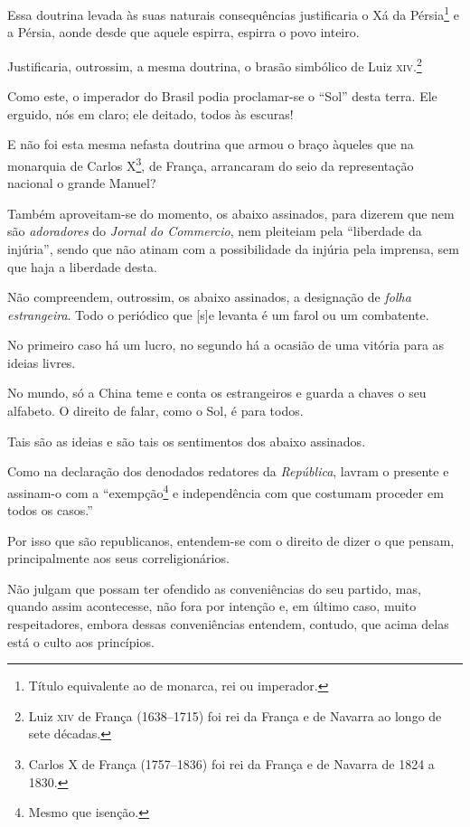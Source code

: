 Essa doutrina levada às suas naturais consequências justificaria o Xá da
Pérsia\footnote{ Título equivalente ao de monarca, rei ou imperador.} e
a Pérsia, aonde desde que aquele espirra, espirra o povo inteiro.

Justificaria, outrossim, a mesma doutrina, o brasão simbólico de Luiz
\textsc{xiv}.\footnote{ Luiz \textsc{xiv} de França (1638--1715) foi rei da França e de
  Navarra ao longo de sete décadas.}

Como este, o imperador do Brasil podia proclamar-se o ``Sol'' desta terra.
Ele erguido, nós em claro; ele deitado, todos às escuras!

E não foi esta mesma nefasta doutrina que armou o braço àqueles que na
monarquia de Carlos X\footnote{ Carlos X de França (1757--1836) foi rei
  da França e de Navarra de 1824 a 1830.}, de França, arrancaram do seio
da representação nacional o grande Manuel?

\noindent\dotfill{}

Também aproveitam-se do momento, os abaixo assinados, para dizerem que
nem são \emph{adoradores} do \emph{Jornal do Commercio}, nem pleiteiam
pela ``liberdade da injúria'', sendo que não atinam com a possibilidade da
injúria pela imprensa, sem que haja a liberdade desta.

Não compreendem, outrossim, os abaixo assinados, a designação de
\emph{folha estrangeira}. Todo o periódico que {[}s{]}e levanta é um
farol ou um combatente.

No primeiro caso há um lucro, no segundo há a ocasião de uma vitória
para as ideias livres.

No mundo, só a China teme e conta os estrangeiros e guarda a chaves o
seu alfabeto. O direito de falar, como o Sol, é para todos.

\noindent\dotfill{}

Tais são as ideias e são tais os sentimentos dos abaixo assinados.

Como na declaração dos denodados redatores da \emph{República}, lavram o
presente e assinam-o com a ``exempção\footnote{ Mesmo que isenção.} e
independência com que costumam proceder em todos os casos.''

Por isso que são republicanos, entendem-se com o direito de dizer o que
pensam, principalmente aos seus correligionários.

Não julgam que possam ter ofendido as conveniências do seu partido, mas,
quando assim acontecesse, não fora por intenção e, em último caso, muito
respeitadores, embora dessas conveniências entendem, contudo, que acima
delas está o culto aos princípios.

